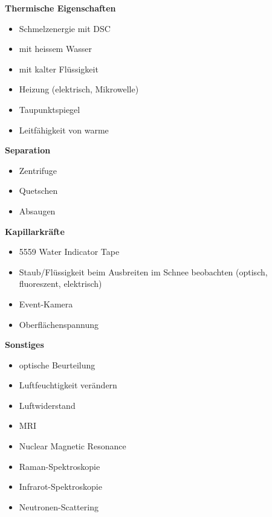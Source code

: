 \begin{multicols}{2}
\columnbreak
\textbf{Thermische Eigenschaften}
\begin{itemize}
\item Schmelzenergie mit DSC
\item mit heissem Wasser
\item mit kalter Flüssigkeit
\item Heizung (elektrisch, Mikrowelle)
\item Taupunktspiegel
\item Leitfähigkeit von warme
\end{itemize}

\textbf{Separation}
\begin{itemize}
\item Zentrifuge
\item Quetschen
\item Absaugen
\end{itemize}

\textbf{Kapillarkräfte}
\begin{itemize}
\item 5559 Water Indicator Tape
\item Staub/Flüssigkeit beim Ausbreiten im Schnee beobachten (optisch, fluoreszent, elektrisch)
\item Event-Kamera
\item Oberflächenspannung
\end{itemize}

\textbf{Sonstiges}
\begin{itemize}
\item optische Beurteilung
\item Luftfeuchtigkeit verändern
\item Luftwiderstand
\item MRI
\item Nuclear Magnetic Resonance
\item Raman-Spektroskopie
\item Infrarot-Spektroskopie
\item Neutronen-Scattering
\end{itemize}
\end{multicols}
